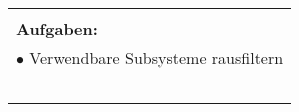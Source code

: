 \begin{table}[!h]
\begin{center}
\begin{tabular}{|p{35mm}||p{55mm}|p{50mm}||p{40mm}|}
   \multicolumn{4}{|p{150mm}|}{}\\
   \multicolumn{4}{|p{150mm}|}{\textbf{Aufgaben:}}\\
   \multicolumn{4}{|p{150mm}|}{$\bullet$ Verwendbare Subsysteme rausfiltern}\\
   \multicolumn{4}{|p{150mm}|}{}\\
   \multicolumn{4}{|p{150mm}|}{}\\
   \multicolumn{4}{|p{150mm}|}{\textbf{}}\\
   \multicolumn{4}{|p{150mm}|}{}\\
   \multicolumn{4}{|p{150mm}|}{}\\
   \hline
  \end{tabular}
 \end{center}
\end{table}

